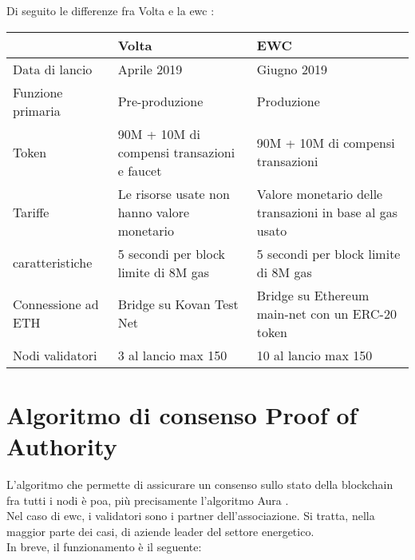 Di seguito le differenze fra Volta e la \gls{ewc} \cite{wiki:ew-two-networks}:

\begin{tabular}{||p{4cm}|p{5cm} p{5cm}||}
    \hline
                       & Volta                                               & EWC                                                     \\ [0.5ex]
    \hline\hline
    Data di lancio     & Aprile 2019                                         & Giugno 2019                                             \\
    \hline
    Funzione primaria  & Pre-produzione                                      & Produzione                                              \\
    \hline
    Token              & 90M + 10M di compensi \newline transazioni e faucet & 90M + 10M di compensi \newline transazioni              \\
    \hline
    Tariffe            & Le risorse usate non hanno valore monetario         & Valore monetario delle transazioni in base al gas usato \\
    \hline
    caratteristiche    & 5 secondi per block \newline limite di 8M gas       & 5 secondi per block \newline limite di 8M gas           \\
    \hline
    Connessione ad ETH & Bridge su Kovan Test Net                            & Bridge su Ethereum main-net con un ERC-20 token         \\
    \hline
    Nodi validatori    & 3 al lancio \newline max 150                        & 10 al lancio \newline max 150                           \\ [1ex]
    \hline
\end{tabular}


\section{Algoritmo di consenso Proof of Authority}
L'algoritmo che permette di assicurare un consenso sullo stato della blockchain fra tutti i nodi è \gls{poa}, più precisamente l'algoritmo Aura \cite{art:aura}\cite{wiki:poa}. \\
Nel caso di \gls{ewc}, i validatori sono i partner dell'associazione.
Si tratta, nella maggior parte dei casi, di aziende leader del settore energetico. \\
In breve, il funzionamento è il seguente:

